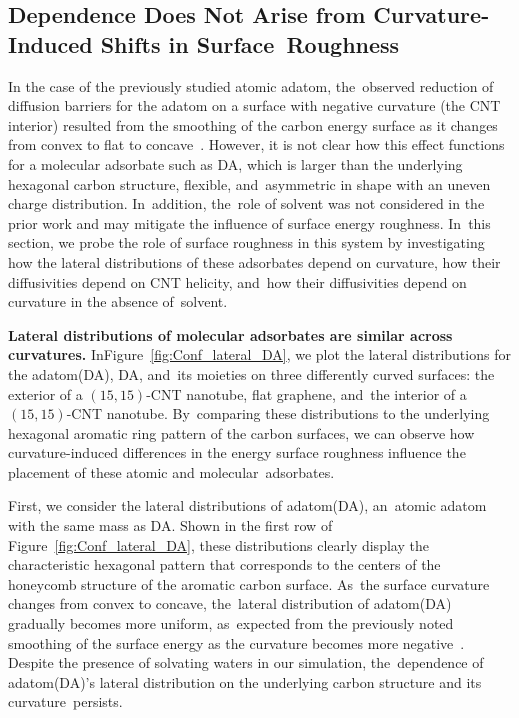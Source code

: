 \documentclass[molecules,article,accept,pdftex,moreauthors]{Definitions/mdpi}
\begin{document}
\subsection{Dependence Does Not Arise from Curvature-Induced Shifts in Surface~Roughness}

In the case of the previously studied atomic adatom, the~observed reduction of diffusion barriers for the adatom on a surface with negative curvature (the CNT interior) resulted from the smoothing of the carbon energy surface as it changes from convex to flat to concave~\cite{Shu2001}. However, it is not clear how this effect functions for a molecular adsorbate such as DA, which is larger than the underlying hexagonal carbon structure, flexible, and~asymmetric in shape with an uneven charge distribution. In~addition, the~role of solvent was not considered in the prior work and may mitigate the influence of surface energy roughness. In~this section, we probe the role of surface roughness in this system by investigating how the lateral distributions of these adsorbates depend on curvature, how their diffusivities depend on CNT helicity, and~how their diffusivities depend on curvature in the absence of~solvent.



{\bf Lateral distributions of molecular adsorbates are similar across curvatures.}  %
In\linebreak Figure~\ref{fig:Conf_lateral_DA}, we plot the lateral distributions for the adatom(DA), DA, and~its moieties on three differently curved surfaces: the exterior of a $(15,15)$-CNT nanotube, flat graphene, and~the interior of a $(15,15)$-CNT nanotube. By~comparing these distributions to the underlying hexagonal aromatic ring pattern of the carbon surfaces, we can observe how curvature-induced differences in the energy surface roughness influence the placement of these atomic and molecular~adsorbates.



First, we consider the lateral distributions of adatom(DA), an~atomic adatom with the same mass as DA. Shown in the first row of Figure~\ref{fig:Conf_lateral_DA}, these distributions clearly display the characteristic hexagonal pattern that corresponds to the centers of the honeycomb structure of the aromatic carbon surface. As~the surface curvature changes from convex to concave, the~lateral distribution of adatom(DA) gradually becomes more uniform, as~expected from the previously noted smoothing of the surface energy as the curvature becomes more negative~\cite{Shu2001}. Despite the presence of solvating waters in our simulation, the~dependence of adatom(DA)'s lateral distribution on the underlying carbon structure and its curvature~persists.
\end{document}
